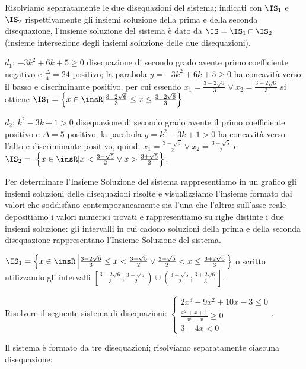 Risolviamo separatamente le due disequazioni del sistema; indicati con $\IS_1$ e $\IS_2$ rispettivamente gli insiemi soluzione della prima e della seconda disequazione, l’insieme soluzione del sistema è dato da $\IS=\IS_1\cap \IS_2$ (insieme intersezione degli insiemi soluzione delle due disequazioni).
\begin{itemize*}
\item $d_1$: $-3k^2+6k+5\ge 0$ disequazione di secondo grado avente primo coefficiente negativo e $\frac{\Delta } 4=24$ positivo; la parabola $y=-3k^2+6k+5\ge 0$ ha concavità verso il basso e discriminante positivo, per cui essendo $x_1=\frac{3-2\sqrt 6} 3\vee x_2=\frac{3+2\sqrt 6} 3$ si ottiene $\IS_1=\left\{x\in \insR | \frac{3-2\sqrt 6} 3\le x\le \frac{3+2\sqrt 6} 3\right\}$.
\item $d_2$: $k^2-3k+1>0$ disequazione di secondo grado avente il primo coefficiente positivo e $\Delta =5$ positivo; la parabola $y=k^2-3k+1>0$ ha concavità verso l'alto e discriminante positivo, quindi $x_1=\frac{3-\sqrt 5} 2\vee x_2=\frac{3+\sqrt 5} 2$ e
$\IS_2=~\left\{x\in \insR | x<\frac{3-\sqrt 5} 2\vee x>\frac{3+\sqrt 5} 2\right\}$.
\end{itemize*}
Per determinare l’Insieme Soluzione del sistema rappresentiamo in un grafico gli insiemi soluzioni delle disequazioni risolte e visualizziamo l’insieme formato dai valori che soddisfano contemporaneamente sia l’una che l’altra: sull’asse reale depositiamo i valori numerici trovati e rappresentiamo su righe distinte i due insiemi soluzione: gli intervalli in cui cadono soluzioni della prima e della seconda disequazione rappresentano l’Insieme Soluzione del sistema.
\begin{center}
 
\end{center}
 $\IS_1=\left\{x\in \insR\left|\frac{3-2\sqrt 6} 3\le x<\frac{3-\sqrt 5} 2\vee \frac{3+\sqrt 5} 2<x\le \frac{3+2\sqrt 6} 3\right.\right\}$ o scritto utilizzando gli intervalli $\left.\left[\frac{3-2\sqrt 6} 3;\frac{3-\sqrt 5} 2\right.\right)\cup \left.\left(\frac{3+\sqrt 5} 2;\frac{3+2\sqrt 6} 3\right.\right]$.

\begin{problema}
Risolvere il seguente sistema di disequazioni: $ \left\{\begin{array}{l}2x^3-9x^2+10x-3\le 0\\ \frac{x^2+x+1}{\ x^3-x}\ge 0 \\3-4x<0 \end{array}\right.$.
\end{problema}
Il sistema è formato da tre disequazioni; risolviamo separatamente ciascuna disequazione:

